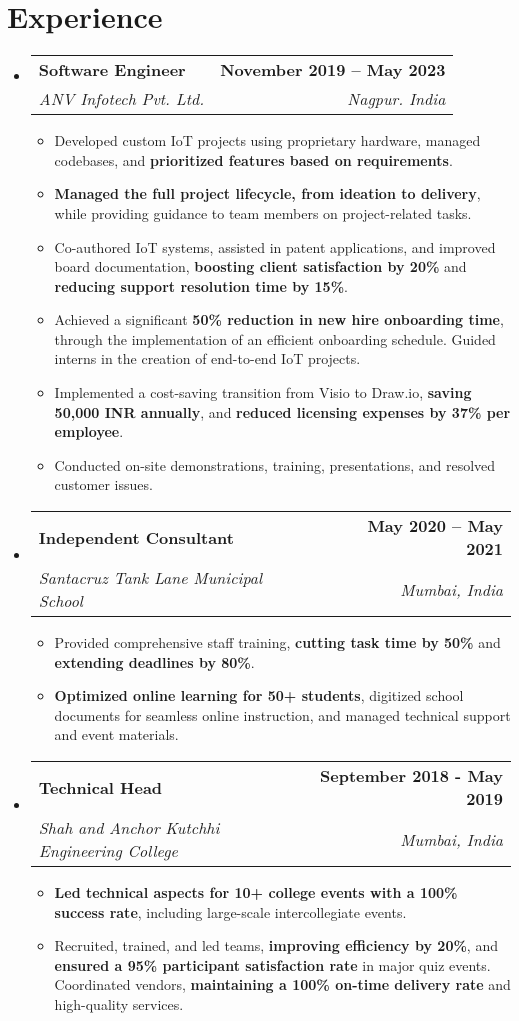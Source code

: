 \documentclass[letterpaper,11pt]{article}
\makeatletter
\newcommand{\resumeItem}[1]{
  \item\small{
    {#1 \vspace{-2pt}}
  }
}
\newcommand{\resumeSubheading}[4]{
  \vspace{-2pt}\item
    \begin{tabular*}{1.0\textwidth}[t]{l@{\extracolsep{\fill}}r}
      \textbf{#1} & \textbf{\small #2} \\
      \textit{\small#3} & \textit{\small #4} \\
    \end{tabular*}\vspace{-7pt}
}
\newcommand{\resumeSubHeadingListStart}{\begin{itemize}[leftmargin=0.0in, label={}]}
\newcommand{\resumeSubHeadingListEnd}{\end{itemize}}
\newcommand{\resumeItemListStart}{\begin{itemize}}
\newcommand{\resumeItemListEnd}{\end{itemize}\vspace{-5pt}}
\makeatother
\begin{document}
\section{Experience}
\resumeSubHeadingListStart

\resumeSubheading
{Software Engineer}
{November 2019 -- May 2023}
{ANV Infotech Pvt. Ltd.}
{Nagpur. India}
\resumeItemListStart
\resumeItem{Developed custom IoT projects using proprietary hardware, managed codebases, and \textbf {prioritized features based on requirements}.}
\resumeItem{\textbf{Managed the full project lifecycle, from ideation to delivery}, while providing guidance to team members on project-related tasks.}
\resumeItem{Co-authored IoT systems, assisted in patent applications, and improved board documentation, \textbf {boosting client satisfaction by 20\%} and \textbf {reducing support resolution time by 15\%}.}
\resumeItem{Achieved a significant \textbf{50\% reduction in new hire onboarding time}, through the implementation of an efficient onboarding schedule. Guided interns in the creation of end-to-end IoT projects.}
\resumeItem{Implemented a cost-saving transition from Visio to Draw.io, \textbf {saving 50,000 INR annually}, and \textbf {reduced licensing expenses by 37\% per employee}.}
\resumeItem{Conducted on-site demonstrations, training, presentations, and resolved customer issues.}
\resumeItemListEnd

\resumeSubheading
{Independent Consultant}
{May 2020 -- May 2021}
{Santacruz Tank Lane Municipal School}
{Mumbai, India}
\resumeItemListStart
\resumeItem{Provided comprehensive staff training, \textbf {cutting task time by 50\%} and \textbf{extending deadlines by 80\%}.}
\resumeItem{\textbf {Optimized online learning for 50+ students}, digitized school documents for seamless online instruction, and managed technical support and event materials.}
\resumeItemListEnd

\resumeSubheading
{Technical Head}
{September 2018 - May 2019}
{Shah and Anchor Kutchhi Engineering College}{Mumbai, India}
\resumeItemListStart
\resumeItem{\textbf {Led technical aspects for 10+ college events with a 100\% success rate}, including large-scale intercollegiate events.}
\resumeItem{ Recruited, trained, and led teams, \textbf{improving efficiency by 20\%}, and \textbf {ensured a 95\% participant satisfaction rate} in major quiz events. Coordinated vendors, \textbf {maintaining a 100\% on-time delivery rate} and high-quality services.}
\resumeItemListEnd

\resumeSubHeadingListEnd
\vspace{-6pt}
\end{document}
